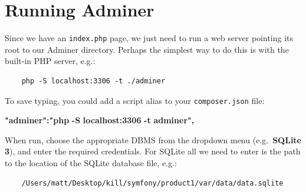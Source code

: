 \documentclass[a4paperpaper,openright]{book}
\newenvironment{Shaded}{}{}
\newcommand{\CommentTok}[1]{\textcolor[rgb]{0.38,0.63,0.69}{\textit{#1}}}
\newcommand{\ErrorTok}[1]{\textcolor[rgb]{1.00,0.00,0.00}{\textbf{#1}}}
\newcommand{\KeywordTok}[1]{\textcolor[rgb]{0.00,0.44,0.13}{\textbf{#1}}}
\newcommand{\NormalTok}[1]{#1}
\newcommand{\OtherTok}[1]{\textcolor[rgb]{0.00,0.44,0.13}{#1}}
\newcommand{\StringTok}[1]{\textcolor[rgb]{0.25,0.44,0.63}{#1}}
\begin{document}
\begin{Shaded}
\end{Shaded}

\hypertarget{running-adminer}{%
\section{Running Adminer}\label{running-adminer}}

Since we have an \texttt{index.php} page, we just need to run a web
server pointing its root to our Adminer directory. Perhaps the simplest
way to do this is with the built-in PHP server, e.g.:

\begin{verbatim}
    php -S localhost:3306 -t ./adminer
\end{verbatim}

To save typing, you could add a script alias to your
\texttt{composer.json} file:

\begin{Shaded}
\begin{Highlighting}[]
    \ErrorTok{"adminer":"php} \ErrorTok{-S} \ErrorTok{localhost:3306} \ErrorTok{-t} \ErrorTok{adminer",}
\end{Highlighting}
\end{Shaded}

When run, choose the appropriate DBMS from the dropdown menu
(e.g.~\textbf{SQLite 3}), and enter the required credentials. For SQLite
all we need to enter is the path to the location of the SQLite database
file, e.g.:

\begin{verbatim}
    /Users/matt/Desktop/kill/symfony/product1/var/data/data.sqlite
\end{verbatim}
\end{document}
